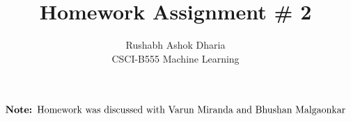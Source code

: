 \documentclass[12pt]{article}
\begin{document}
 
 
 
\title{Homework Assignment # 2}
\author{Rushabh Ashok Dharia\\ 
CSCI-B555 Machine Learning} 
\maketitle

\begin{multline*}
    \text{\textbf{Note: }Homework was discussed with Varun Miranda and Bhushan Malgaonkar}
\end{multline*} 
 
\end{document}
